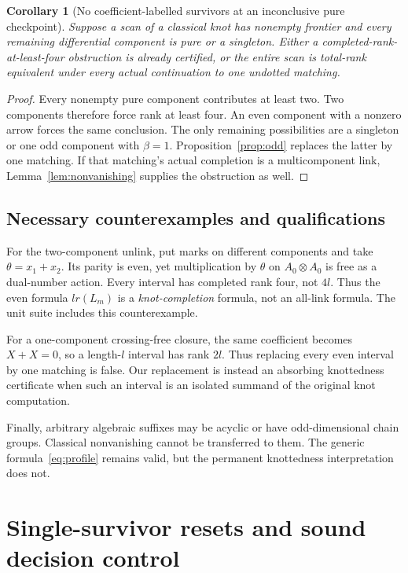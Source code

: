 \documentclass[11pt]{article}
\newtheorem{corollary}[theorem]{Corollary}
\theoremstyle{definition}\newtheorem{definition}[theorem]{Definition}\newtheorem{example}[theorem]{Example}
\theoremstyle{remark}\newtheorem{remark}[theorem]{Remark}
\begin{document}
\begin{corollary}[No coefficient-labelled survivors at an inconclusive pure checkpoint]\label{cor:purecheckpoint}
Suppose a scan of a classical knot has nonempty frontier and every remaining differential component is pure or a singleton. Either a completed-rank-at-least-four obstruction is already certified, or the entire scan is total-rank equivalent under every actual continuation to one undotted matching.
\end{corollary}
\begin{proof}
Every nonempty pure component contributes at least two. Two components therefore force rank at least four. An even component with a nonzero arrow forces the same conclusion. The only remaining possibilities are a singleton or one odd component with $\beta=1$. Proposition~\ref{prop:odd} replaces the latter by one matching. If that matching's actual completion is a multicomponent link, Lemma~\ref{lem:nonvanishing} supplies the obstruction as well.
\end{proof}

\subsection{Necessary counterexamples and qualifications}
For the two-component unlink, put marks on different components and take $\theta=x_1+x_2$. Its parity is even, yet multiplication by $\theta$ on $A_0\otimes A_0$ is free as a dual-number action. Every interval has completed rank four, not $4l$. Thus the even formula $l r(L_m)$ is a \emph{knot-completion} formula, not an all-link formula. The unit suite includes this counterexample.

For a one-component crossing-free closure, the same coefficient becomes $X+X=0$, so a length-$l$ interval has rank $2l$. Thus replacing every even interval by one matching is false. Our replacement is instead an absorbing knottedness certificate when such an interval is an isolated summand of the original knot computation.

Finally, arbitrary algebraic suffixes may be acyclic or have odd-dimensional chain groups. Classical nonvanishing cannot be transferred to them. The generic formula~\eqref{eq:profile} remains valid, but the permanent knottedness interpretation does not.

\section{Single-survivor resets and sound decision control}
\end{document}

